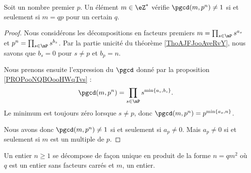 \begin{corollary}       \label{CORooQIMHooUzLUJY}
	Soit un nombre premier \( p\). Un élément \( m\in \eZ^*\) vérifie \( \pgcd(m,p^n)\neq 1\) si et seulement si \( m=qp\) pour un certain \( q\).
\end{corollary}

\begin{proof}
	Nous considérons les décompositions en facteurs premiers \( m=\prod_{s\in\mP}s^{a_s}\) et \( p^n=\prod_{s\in\mP}s^{b_s}\). Par la partie unicité du théorème \ref{ThoAJFJooAveRvY}, nous savons que \( b_s=0\) pour \( s\neq p\) et \( b_p=n\).

	Nous prenons ensuite l'expression du \( \pgcd\) donné par la proposition \ref{PROPooNQBOooHWqTvs} :
	\begin{equation}
		\pgcd(m,p^n)=\prod_{s\in\mP}s^{\min\{ a_s,b_s \}}.
	\end{equation}
	Le minimum est toujours zéro lorsque \( s\neq p\), donc \( \pgcd(m,p^n)=p^{\min\{ a_s,n \}}\).

	Nous avons donc \( \pgcd(m,p^n)\neq 1\) si et seulement si \( a_p\neq 0\). Mais \( a_p\neq 0\) si et seulement si \( m\) est un multiple de \( p\).
\end{proof}

\begin{lemma}   \label{LemheKdsa}
	Un entier \( n\geq 1\) se décompose de façon unique en produit de la forme \( n=qm^2\) où \( q\) est un entier sans facteurs carrés et \( m\), un entier.
\end{lemma}

